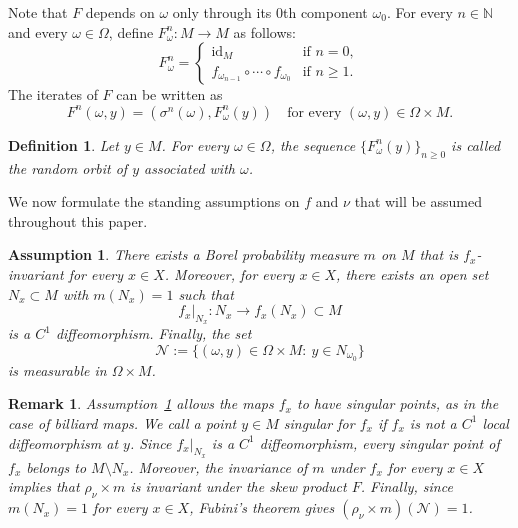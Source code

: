 \documentclass[a4paper,12pt,reqno]{amsart}
\numberwithin{equation}{section}
\newtheorem{assumption}{Assumption}
\newtheorem{remark}[theorem]{Remark}
\newtheorem{defn}[theorem]{Definition}
\newcommand{\cal}{\mathcal}
\newcommand{\NN}{{\cal N}}
\newcommand{\Nn}{{\mathbb{N}}}
\begin{document}
Note that $F$ depends on $\omega$ only through its 0th component $\omega_0$. For every $n \in \Nn$ and every $ \omega \in \Omega$, define $F^{n}_\omega \colon M \to M$ as follows: 
\[
F^{n}_\omega = 
\begin{cases}
\operatorname{id}_M & \text{if } n=0, \\
f_{\omega_{n-1}} \circ \cdots \circ f_{\omega_0}  & \text{if } n \ge 1.
\end{cases}
\]
The iterates of $F$ can be written as 
\[
F^{n}(\omega,y)=(\sigma^n(\omega),F^{n}_{\omega}(y)) \quad  \text{for every } (\omega,y) \in \Omega \times M.
\]

\begin{defn}
Let $y \in M$. For every $\omega \in \Omega$, the sequence $\{F^n_{\omega}(y)\}_{n \ge 0}$ is called the \emph{random orbit of $y$ associated with $\omega$}.
\end{defn}

We now formulate the standing assumptions on $f$ and $\nu$ that will be assumed throughout this paper.

\begin{assumption}\label{as:one}
There exists a Borel probability measure $m$ on $M$ that is $f_x$-invariant for every $x\in X$. Moreover, for every $x\in X$, there exists an open set $N_x\subset M$ with
$m(N_x)=1$ such that
\[
    f_x|_{N_x}\colon N_x\to f_x(N_x)\subset M
\]
is a $C^1$ diffeomorphism. Finally, the set
\[
    \NN:=\{(\omega,y)\in\Omega\times M:\ y\in N_{\omega_0}\}
\]
is measurable in $\Omega\times M$.
\end{assumption}


\begin{remark}
Assumption~\ref{as:one} allows the maps $f_x$ to have singular points, as in the case of billiard maps. We call a point $y\in M$ singular for $f_x$ if $f_x$ is not a $C^1$ local diffeomorphism at $y$. Since
$f_x|_{N_x}$ is a $C^1$ diffeomorphism, every singular point of $f_x$ belongs to $M\setminus N_x$. Moreover, the invariance of $m$ under $f_x$ for every $x\in X$ implies that $\rho_\nu\times m$ is invariant under the skew product $F$. Finally, since $m(N_x)=1$ for every $x\in X$, Fubini's theorem gives $(\rho_\nu\times m)(\NN)=1$.
\end{remark}
\end{document}
